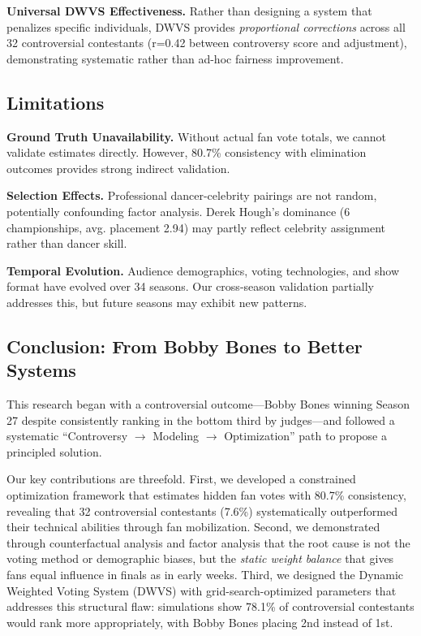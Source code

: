 \documentclass{mcmthesis}
\begin{document}
\textbf{Universal DWVS Effectiveness.} Rather than designing a system that penalizes specific individuals, DWVS provides \textit{proportional corrections} across all 32 controversial contestants (r=0.42 between controversy score and adjustment), demonstrating systematic rather than ad-hoc fairness improvement.

\subsection{Limitations}

\textbf{Ground Truth Unavailability.} Without actual fan vote totals, we cannot validate estimates directly. However, 80.7\% consistency with elimination outcomes provides strong indirect validation.

\textbf{Selection Effects.} Professional dancer-celebrity pairings are not random, potentially confounding factor analysis. Derek Hough's dominance (6 championships, avg. placement 2.94) may partly reflect celebrity assignment rather than dancer skill.

\textbf{Temporal Evolution.} Audience demographics, voting technologies, and show format have evolved over 34 seasons. Our cross-season validation partially addresses this, but future seasons may exhibit new patterns.

\subsection{Conclusion: From Bobby Bones to Better Systems}

This research began with a controversial outcome---Bobby Bones winning Season 27 despite consistently ranking in the bottom third by judges---and followed a systematic ``Controversy $\rightarrow$ Modeling $\rightarrow$ Optimization'' path to propose a principled solution.

Our key contributions are threefold. First, we developed a constrained optimization framework that estimates hidden fan votes with 80.7\% consistency, revealing that 32 controversial contestants (7.6\%) systematically outperformed their technical abilities through fan mobilization. Second, we demonstrated through counterfactual analysis and factor analysis that the root cause is not the voting method or demographic biases, but the \textit{static weight balance} that gives fans equal influence in finals as in early weeks. Third, we designed the Dynamic Weighted Voting System (DWVS) with grid-search-optimized parameters that addresses this structural flaw: simulations show 78.1\% of controversial contestants would rank more appropriately, with Bobby Bones placing 2nd instead of 1st.
\end{document}
